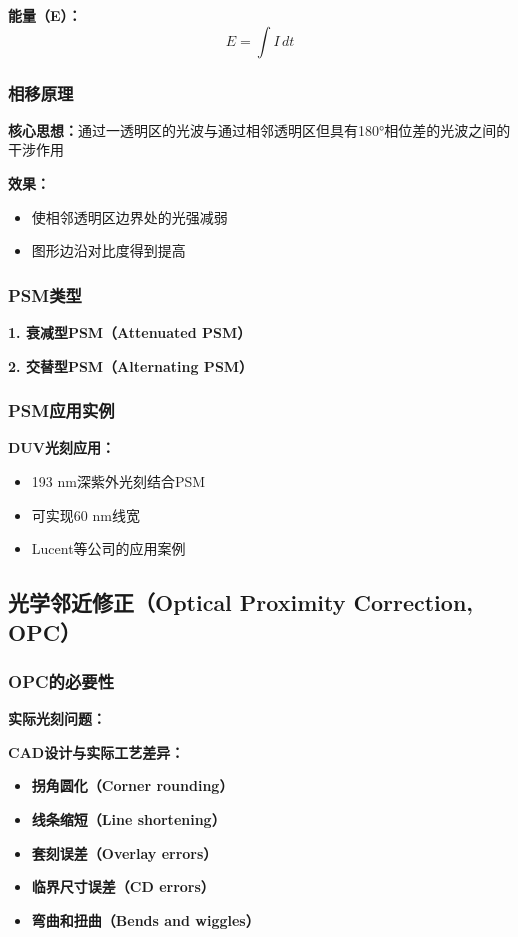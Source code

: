 \documentclass[UTF8,12pt,a4paper]{ctexart}
\begin{document}
\textbf{能量（E）：}
\begin{equation}
E = \int I \, dt
\end{equation}

\subsubsection{相移原理}

\textbf{核心思想：}通过一透明区的光波与通过相邻透明区但具有180°相位差的光波之间的干涉作用

\textbf{效果：}
\begin{itemize}
    \item 使相邻透明区边界处的光强减弱
    \item 图形边沿对比度得到提高
\end{itemize}

\subsubsection{PSM类型}

\textbf{1. 衰减型PSM（Attenuated PSM）}

\textbf{2. 交替型PSM（Alternating PSM）}

\subsubsection{PSM应用实例}

\textbf{DUV光刻应用：}
\begin{itemize}
    \item 193 nm深紫外光刻结合PSM
    \item 可实现60 nm线宽
    \item Lucent等公司的应用案例
\end{itemize}

\subsection{光学邻近修正（Optical Proximity Correction, OPC）}

\subsubsection{OPC的必要性}

\textbf{实际光刻问题：}

\textbf{CAD设计与实际工艺差异：}
\begin{itemize}
    \item \textbf{拐角圆化（Corner rounding）}
    \item \textbf{线条缩短（Line shortening）}
    \item \textbf{套刻误差（Overlay errors）}
    \item \textbf{临界尺寸误差（CD errors）}
    \item \textbf{弯曲和扭曲（Bends and wiggles）}
\end{itemize}
\end{document}
